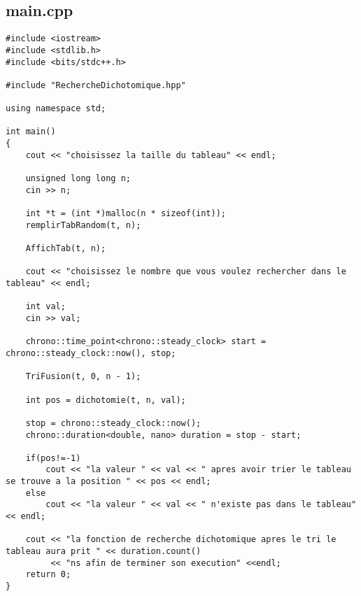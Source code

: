 \subsection{main.cpp}
\begin{verbatim}
#include <iostream>
#include <stdlib.h>
#include <bits/stdc++.h>

#include "RechercheDichotomique.hpp"

using namespace std;

int main()
{
    cout << "choisissez la taille du tableau" << endl;

    unsigned long long n;
    cin >> n;

    int *t = (int *)malloc(n * sizeof(int));
    remplirTabRandom(t, n);

    AffichTab(t, n);

    cout << "choisissez le nombre que vous voulez rechercher dans le tableau" << endl;

    int val;
    cin >> val;

    chrono::time_point<chrono::steady_clock> start = chrono::steady_clock::now(), stop;

    TriFusion(t, 0, n - 1);

    int pos = dichotomie(t, n, val);

    stop = chrono::steady_clock::now();
    chrono::duration<double, nano> duration = stop - start;

    if(pos!=-1)
        cout << "la valeur " << val << " apres avoir trier le tableau se trouve a la position " << pos << endl;
    else
        cout << "la valeur " << val << " n'existe pas dans le tableau" << endl;

    cout << "la fonction de recherche dichotomique apres le tri le tableau aura prit " << duration.count()
         << "ns afin de terminer son execution" <<endl;
    return 0;
}
\end{verbatim}

